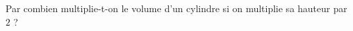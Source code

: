 
\begin{exercice}\label{exoSeconde-0092}

    Par combien multiplie-t-on le volume d'un cylindre si on multiplie sa hauteur par \( 2\) ?

\end{exercice}
